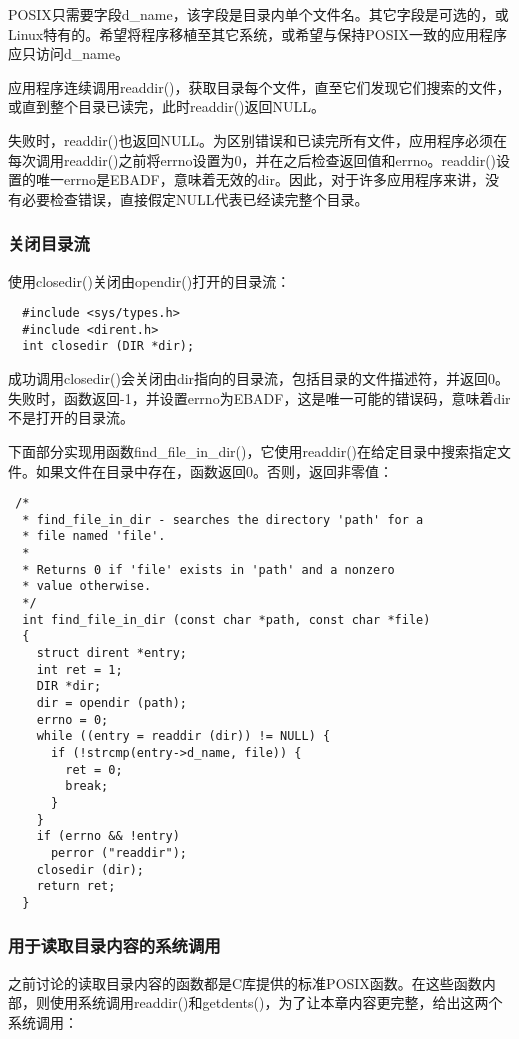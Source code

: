 POSIX只需要字段d\_name，该字段是目录内单个文件名。其它字段是可选的，或Linux特有的。希望将程序移植至其它系统，或希望与保持POSIX一致的应用程序应只访问d\_name。

应用程序连续调用readdir()，获取目录每个文件，直至它们发现它们搜索的文件，或直到整个目录已读完，此时readdir()返回NULL。

失败时，readdir()也返回NULL。为区别错误和已读完所有文件，应用程序必须在每次调用readdir()之前将errno设置为0，并在之后检查返回值和errno。readdir()设置的唯一errno是EBADF，意味着无效的dir。因此，对于许多应用程序来讲，没有必要检查错误，直接假定NULL代表已经读完整个目录。

\subsubsection{关闭目录流}

使用closedir()关闭由opendir()打开的目录流：

\begin{lstlisting}
  #include <sys/types.h>
  #include <dirent.h>
  int closedir (DIR *dir);
\end{lstlisting}

成功调用closedir()会关闭由dir指向的目录流，包括目录的文件描述符，并返回0。失败时，函数返回-1，并设置errno为EBADF，这是唯一可能的错误码，意味着dir不是打开的目录流。

下面部分实现用函数find\_file\_in\_dir()，它使用readdir()在给定目录中搜索指定文件。如果文件在目录中存在，函数返回0。否则，返回非零值：

\begin{lstlisting}
 /*
  * find_file_in_dir - searches the directory 'path' for a
  * file named 'file'.
  *
  * Returns 0 if 'file' exists in 'path' and a nonzero
  * value otherwise.
  */
  int find_file_in_dir (const char *path, const char *file)
  {
    struct dirent *entry;
    int ret = 1;
    DIR *dir;
    dir = opendir (path);
    errno = 0;
    while ((entry = readdir (dir)) != NULL) {
      if (!strcmp(entry->d_name, file)) {
        ret = 0;
        break;
      }
    }
    if (errno && !entry)
      perror ("readdir");
    closedir (dir);
    return ret;
  }
\end{lstlisting}

\subsubsection{用于读取目录内容的系统调用}

之前讨论的读取目录内容的函数都是C库提供的标准POSIX函数。在这些函数内部，则使用系统调用readdir()和getdents()，为了让本章内容更完整，给出这两个系统调用：


